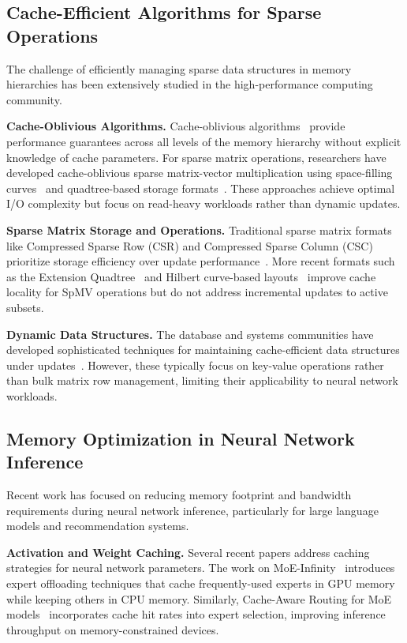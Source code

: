 \documentclass{article}
\numberwithin{equation}{section}
\theoremstyle{plain}
\theoremstyle{definition}
\theoremstyle{remark}
\begin{document}
\subsection{Cache-Efficient Algorithms for Sparse Operations}

The challenge of efficiently managing sparse data structures in memory hierarchies has been extensively studied in the high-performance computing community.

\textbf{Cache-Oblivious Algorithms.} Cache-oblivious algorithms~\cite{frigo1999cache} provide performance guarantees across all levels of the memory hierarchy without explicit knowledge of cache parameters. For sparse matrix operations, researchers have developed cache-oblivious sparse matrix-vector multiplication using space-filling curves~\cite{chatterjee2002cache} and quadtree-based storage formats~\cite{wise2001amdahls}. These approaches achieve optimal I/O complexity but focus on read-heavy workloads rather than dynamic updates.

\textbf{Sparse Matrix Storage and Operations.} Traditional sparse matrix formats like Compressed Sparse Row (CSR) and Compressed Sparse Column (CSC) prioritize storage efficiency over update performance~\cite{saad2003iterative}. More recent formats such as the Extension Quadtree~\cite{bader2013cache} and Hilbert curve-based layouts~\cite{mitchell2010cache} improve cache locality for SpMV operations but do not address incremental updates to active subsets.

\textbf{Dynamic Data Structures.} The database and systems communities have developed sophisticated techniques for maintaining cache-efficient data structures under updates~\cite{brodal2006cache}. However, these typically focus on key-value operations rather than bulk matrix row management, limiting their applicability to neural network workloads.

\subsection{Memory Optimization in Neural Network Inference}

Recent work has focused on reducing memory footprint and bandwidth requirements during neural network inference, particularly for large language models and recommendation systems.

\textbf{Activation and Weight Caching.} Several recent papers address caching strategies for neural network parameters. The work on MoE-Infinity~\cite{nie2024moe} introduces expert offloading techniques that cache frequently-used experts in GPU memory while keeping others in CPU memory. Similarly, Cache-Aware Routing for MoE models~\cite{liu2024mixture} incorporates cache hit rates into expert selection, improving inference throughput on memory-constrained devices.
\end{document}
